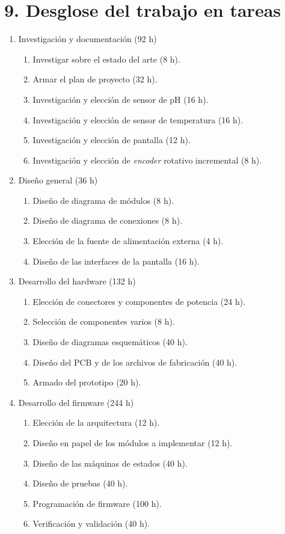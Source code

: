 \documentclass[
11pt, %
codirector, %
]{charter}
\begin{document}
\section{9. Desglose del trabajo en tareas}
\label{sec:wbs}

\begin{enumerate}
\item Investigación y documentación (92 h)
	\begin{enumerate}
	\item Investigar sobre el estado del arte (8 h).
	\item Armar el plan de proyecto (32 h).
	\item Investigación y elección de sensor de pH (16 h).
	\item Investigación y elección de sensor de temperatura (16 h).
	\item Investigación y elección de pantalla (12 h).
	\item Investigación y elección de \textit{encoder} rotativo incremental (8 h).
	\end{enumerate}
	
\item Diseño general (36 h)
	\begin{enumerate}
	\item Diseño de diagrama de módulos (8 h).
	\item Diseño de diagrama de conexiones (8 h).
	\item Elección de la fuente de alimentación externa (4 h).
	\item Diseño de las interfaces de la pantalla (16 h).
	\end{enumerate}
	
\item Desarrollo del hardware (132 h)
	\begin{enumerate}
	\item Elección de conectores y componentes de potencia (24 h).
	\item Selección de componentes varios (8 h).
	\item Diseño de diagramas esquemáticos (40 h).
	\item Diseño del PCB y de los archivos de fabricación (40 h).
	\item Armado del prototipo (20 h).
	\end{enumerate}
	
\item Desarrollo del firmware (244 h)
	\begin{enumerate}
	\item Elección de la arquitectura (12 h).
	\item Diseño en papel de los módulos a implementar (12 h).
	\item Diseño de las máquinas de estados (40 h).
	\item Diseño de pruebas (40 h).
	\item Programación de firmware (100 h).
	\item Verificación y validación (40 h).
	\end{enumerate}
	

\end{enumerate}
\end{document}
